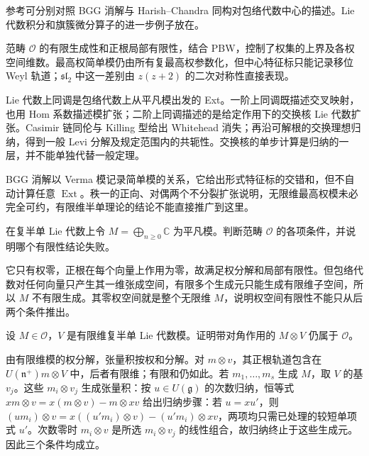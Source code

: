 \ProseParagraphBreak
参考\cite[Sections 8.4 and 8.8]{Kirillov2008LieGroups}可分别对照 BGG 消解与 Harish--Chandra 同构对包络代数中心的描述。Lie 代数积分和旗簇微分算子的进一步例子放在。






\begin{chaptersummary}
	范畴 \(\mathcal O\) 的有限生成性和正根局部有限性，结合 PBW，控制了权集的上界及各权空间维数。最高权简单模仍由所有复最高权参数化，但中心特征标只能记录移位 Weyl 轨道；\(\mathfrak{sl}_2\) 中这一差别由 \(z(z+2)\) 的二次对称性直接表现。

	\ProseParagraphBreak
	Lie 代数上同调是包络代数上从平凡模出发的 Ext。一阶上同调既描述交叉映射，也用 Hom 系数描述模扩张；二阶上同调描述的是给定作用下的交换核 Lie 代数扩张。Casimir 链同伦与 Killing 型给出 Whitehead 消失；再沿可解根的交换理想归纳，得到一般 Levi 分解及规定范围内的共轭性。交换核的单步计算是归纳的一层，并不能单独代替一般定理。

	\ProseParagraphBreak
	BGG 消解以 Verma 模记录简单模的关系，它给出形式特征标的交错和，但不自动计算任意 \(\operatorname{Ext}\)。秩一的正向、对偶两个不分裂扩张说明，无限维最高权模未必完全可约，有限维半单理论的结论不能直接推广到这里。
\end{chaptersummary}

\BookExercises

\begin{optionalexercise}\label{b5:ex:20-o-finite-generation}
	在复半单 Lie 代数上令 \(M=\bigoplus_{n\ge0}\mathbb C\) 为平凡模。判断范畴 \(\mathcal O\) 的各项条件，并说明哪个有限性结论失败。
\end{optionalexercise}
\begin{solution}
	它只有权零，正根在每个向量上作用为零，故满足权分解和局部有限性。但包络代数对任何向量只产生其一维张成空间，有限多个生成元只能生成有限维子空间，所以 \(M\) 不有限生成。其零权空间就是整个无限维 \(M\)，说明权空间有限性不能只从后两个条件推出。
\end{solution}

\begin{optionalexercise}\label{b5:ex:20-o-tensor}
	设 \(M\in\mathcal O\)，\(V\) 是有限维复半单 Lie 代数模。证明带对角作用的 \(M\otimes V\) 仍属于 \(\mathcal O\)。
\end{optionalexercise}
\begin{solution}
	由有限维模的权分解，张量积按权和分解。对 \(m\otimes v\)，其正根轨道包含在 \(U(\mathfrak n^+)m\otimes V\) 中，后者有限维；有限和仍如此。若 \(m_1,\ldots,m_s\) 生成 \(M\)，取 \(V\) 的基 \(v_j\)。这些 \(m_i\otimes v_j\) 生成张量积：按 \(u\in U(\mathfrak g)\) 的次数归纳，恒等式 \(xm\otimes v=x(m\otimes v)-m\otimes xv\) 给出归纳步骤：若 \(u=xu'\)，则 \((um_i)\otimes v=x((u'm_i)\otimes v)-(u'm_i)\otimes xv\)，两项均只需已处理的较短单项式 \(u'\)。次数零时 \(m_i\otimes v\) 是所选 \(m_i\otimes v_j\) 的线性组合，故归纳终止于这些生成元。因此三个条件均成立。
\end{solution}


